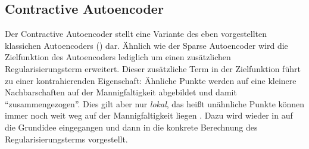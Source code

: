 \subsection{Contractive Autoencoder}
\label{ch:MethodenDerDimRed:ML:CAE}

Der Contractive Autoencoder \parencite{Rifai.2011} stellt eine Variante des eben vorgestellten klassichen Autoencoders
() dar. Ähnlich wie der Sparse Autoencoder wird die
Zielfunktion des Autoencoders lediglich um einen zusätzlichen Regularisierungsterm erweitert.
Dieser zusätzliche Term in der Zielfunktion führt zu einer kontrahierenden Eigenschaft: Ähnliche
Punkte werden auf eine kleinere Nachbarschaften auf der Mannigfaltigkeit abgebildet und damit
\enquote{zusammengezogen}. Dies gilt aber nur \textit{lokal}, das heißt unähnliche Punkte können
immer noch weit weg auf der Mannigfaltigkeit liegen \parencite[521]{Goodfellow.2016}. Dazu wird wieder in 
auf die Grundidee eingegangen und dann in 
die konkrete Berechnung des Regularisierungsterms vorgestellt.

